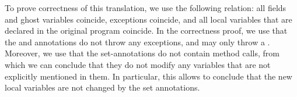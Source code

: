 To prove correctness of this translation, we use the following
relation: all fields and ghost variables coincide, exceptions
coincide, and all local variables that are declared in the original
program coincide. In the correctness proof, we use that the \postset
and \excset annotations do not throw any exceptions, and \preset may only
throw a \JMLExc. Moreover, we use that the set-annotations do not
contain method calls, from which we can conclude that they do not
modify any variables that are not explicitly mentioned in them. In
particular, this allows to conclude that the new local variables are
not changed by the set annotations.






